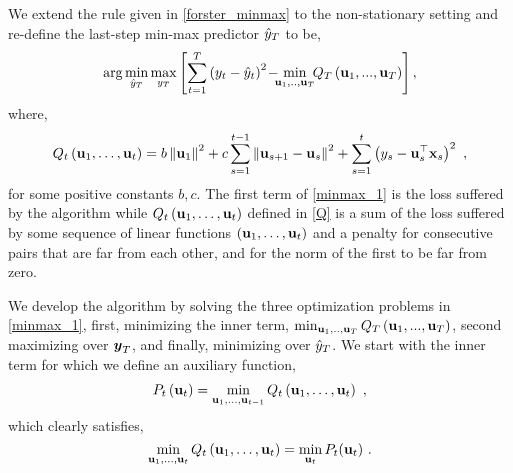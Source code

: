 We extend the rule given in \eqref{forster_minmax} to the non-stationary setting and re-define the last-step min-max
predictor $\hat{y}_{T}$ to be,
\begin{align}
\arg\min_{\hat{y}_{T}}\max_{y_{T}}\left[\sum_{t=1}^{T}\left(y_{t}-\hat{y}_{t}\right)^{2}\!-\!\!\!\min_{\mathbf{u}_{1},
    .. ,\mathbf{u}_{T}}
  \!\! Q_{T}\left(\mathbf{u}_{1}, ... ,\mathbf{u}_{T}\right)\right],\label{minmax_1}
\end{align}
where,
\begin{align}
Q_{t}\left(\mathbf{u}_{1},\ldots,\mathbf{u}_{t}\right) = b\left\Vert
  \mathbf{u}_{1}\right\Vert ^{2}+c\sum_{s=1}^{t-1}\left\Vert
  \mathbf{u}_{s+1}-\mathbf{u}_{s}\right\Vert ^{2}
+\sum_{s=1}^{t}\left(y_{s}-{\mathbf{u}}^{\top}_{s}\mathbf{x}_{s}\right)^{2}~,\label{Q}
\end{align}
for some positive constants $b,c$. The first term of \eqref{minmax_1}
is the loss suffered by the algorithm while
$Q_{t}\left(\mathbf{u}_{1},\ldots,\mathbf{u}_{t}\right)$ defined in
\eqref{Q} is a sum of the loss suffered by some sequence of linear
functions $\left(\mathbf{u}_{1},\ldots,\mathbf{u}_{t}\right)$ and a
penalty for consecutive pairs that are far from each other, and for the
norm of the first to be far from zero.

%
We develop the algorithm by solving the three optimization problems in
\eqref{minmax_1}, first, minimizing the inner term,
$\min_{\mathbf{u}_{1}, .. ,\mathbf{u}_{T}}
Q_{T}\left(\mathbf{u}_{1}, ... ,\mathbf{u}_{T}\right)$, second maximizing
over ${\boldsymbol{y}}_{T}$, and finally, minimizing over $\hat{y}_{T}$.  We start with
the inner term
for which we define an auxiliary function,
\begin{align*}
P_{t}\left(\vui{t}\right)=\min_{\vui{1},\ldots,\vui{t-1}}Q_{t}\left(\vui{1},\ldots,\vui{t}\right) ~,%
\end{align*}
 which clearly satisfies,
\begin{equation*}
\min_{\vui{1},\ldots,\vui{t}}Q_{t}\left(\vui{1},\ldots,\vui{t}\right)
= \min_{\vui{t}} P_t(\vui{t}) ~.%
\end{equation*}

